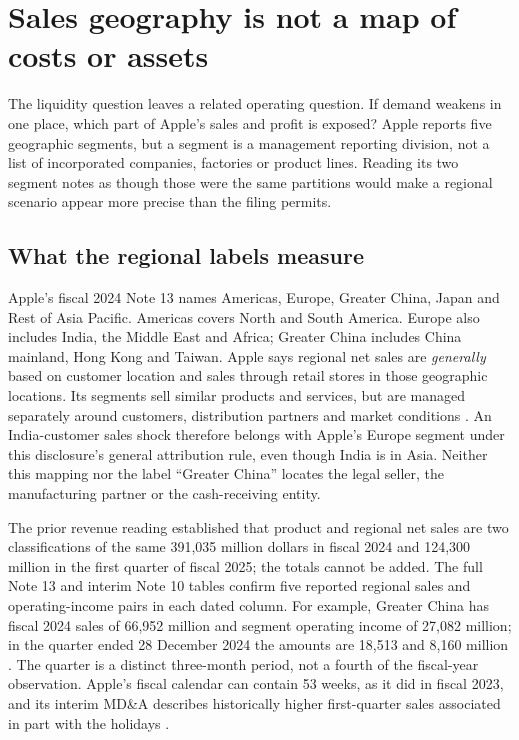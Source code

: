 \section{Sales geography is not a map of costs or assets}
\label{sec:apple-segments}

The liquidity question leaves a related operating question. If demand weakens
in one place, which part of Apple's sales and profit is exposed? Apple reports
five geographic segments, but a segment is a management reporting division,
not a list of incorporated companies, factories or product lines. Reading its
two segment notes as though those were the same partitions would make a
regional scenario appear more precise than the filing permits.

\subsection{What the regional labels measure}

Apple's fiscal 2024 Note 13 names Americas, Europe, Greater China, Japan and
Rest of Asia Pacific. Americas covers North and South America. Europe also
includes India, the Middle East and Africa; Greater China includes China
mainland, Hong Kong and Taiwan. Apple says regional net sales are
\emph{generally} based on customer location and sales through retail stores
in those geographic locations. Its segments sell similar products and
services, but are managed separately around customers, distribution partners
and market conditions \citep[Note 13, printed pp.~46--47]{apple2024}. An
India-customer sales shock therefore belongs with Apple's Europe segment
under this disclosure's general attribution rule, even though India is in Asia. Neither this mapping
nor the label ``Greater China'' locates the legal seller, the manufacturing
partner or the cash-receiving entity.

The prior revenue reading established that product and regional net sales are
two classifications of the same 391,035 million dollars in fiscal 2024 and
124,300 million in the first quarter of fiscal 2025; the totals cannot be
added. The full Note 13 and interim Note 10 tables confirm five reported
regional sales and operating-income pairs in each dated column. For example,
Greater China has fiscal 2024 sales of 66,952 million and segment operating
income of 27,082 million; in the quarter ended 28 December 2024 the amounts
are 18,513 and 8,160 million
\citep[Note 13, printed p.~47]{apple2024}
\citep[Note 10, printed p.~11]{apple2025q1}. The quarter is a distinct
three-month period, not a fourth of the fiscal-year observation. Apple's
fiscal calendar can contain 53 weeks, as it did in fiscal 2023, and its
interim MD\&A describes historically higher first-quarter sales associated
in part with the holidays \citep[Note 1 and MD\&A]{apple2024,apple2025q1}.


